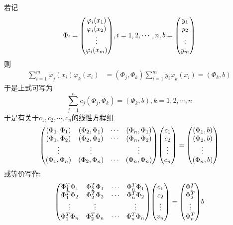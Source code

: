 若记
\begin{equation*}
    \Phi_i=\mqty(
        \varphi_i(x_1)\\\varphi_i(x_2)\\\vdots\\\varphi_i(x_m)
    ), i=1,2,\cdots,n,b=\mqty(
        y_1\\y_2\\\vdots\\y_m
    )
\end{equation*}
则
\begin{align*}
    \sum_{i=1}^m\varphi_j(x_i)\varphi_k(x_i)&=(\Phi_j,\Phi_k)
    \sum_{i=1}^my_i\varphi_k(x_i)=(\Phi_k,b)
\end{align*}
于是上式可写为
\begin{equation*}
    \sum_{j=1}^nc_j(\Phi_j,\Phi_k)=(\Phi_k,b), k=1,2,\cdots,n
\end{equation*}
于是有关于$c_1,c_2,\cdots,c_n$的线性方程组
\begin{equation*}
    \mqty(
        (\Phi_1,\Phi_1)&(\Phi_2,\Phi_1)&\cdots&(\Phi_n,\Phi_1)\\
        (\Phi_1,\Phi_2)&(\Phi_2,\Phi_2)&\cdots&(\Phi_n,\Phi_2)\\
        \vdots&\vdots&&\vdots\\
        (\Phi_1,\Phi_n)&(\Phi_2,\Phi_n)&\cdots&(\Phi_n,\Phi_n)\\
    )\mqty(
        c_1\\c_2\\\vdots\\c_n
    )=\mqty(
        (\Phi_1,b)\\(\Phi_2,b)\\\vdots\\(\Phi_n,b)
    )
\end{equation*}
或等价写作:
\begin{equation*}
    \mqty(
        \Phi_1^T\Phi_1&\Phi_2^T\Phi_1&\cdots&\Phi_n^T\Phi_1\\
        \Phi_1^T\Phi_2&\Phi_2^T\Phi_2&\cdots&\Phi_n^T\Phi_2\\
        \vdots&\vdots& &\vdots\\
        \Phi_1^T\Phi_n&\Phi_2^T\Phi_n&\cdots&\Phi_n^T\Phi_n
    )\mqty(
        c_1\\c_2\\\vdots\\v_n
    )=\mqty(
        \Phi_1^T\\\Phi_2^T\\\vdots\\\Phi_n^T
    )b
\end{equation*}

